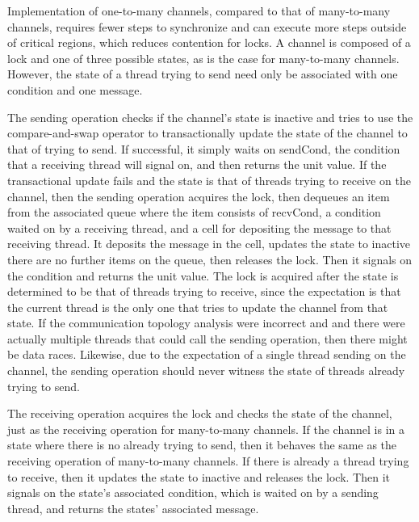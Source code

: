\documentclass{article}
\begin{document}
Implementation of one-to-many channels, compared to that of many-to-many channels,
requires fewer
steps to synchronize and can execute more steps outside of critical regions, which reduces
contention for locks.  A channel is composed of a lock and one of three possible states, as is
the case for many-to-many channels.  However, the state of a thread trying to send need only be
associated with one condition and one message.  

The sending operation checks if the channel's state is inactive and tries to use the
compare-and-swap operator to transactionally update the state of the channel to that of trying to
send.  If successful, it simply waits on sendCond, the condition that a receiving thread will
signal on, and then returns the unit value.  If the transactional update fails and the state is
that of threads trying to receive on the channel, then the sending operation acquires the lock,
then dequeues an item from the associated queue where the item consists of recvCond, a
condition waited on by a receiving thread, and a cell for depositing the message to that
receiving thread.  It deposits the message in the cell, updates the state to inactive there are
no further items on the queue, then releases the lock.  Then it signals on the condition and
returns the unit value. The lock is acquired after the state is determined to be that of
threads trying to receive, since the expectation is that the current thread is the only one
that tries to update the channel from that state.  If the communication topology analysis were
incorrect and and there were actually multiple threads that could call the sending operation, then
there might be data races.  Likewise, due to the expectation of a single thread sending on the
channel, the sending operation should never witness the state of threads already trying to send.

The receiving operation acquires the lock and checks the state of the channel, just as the receiving
operation for many-to-many channels.  If the channel is in a state where there is no already
trying to send, then it behaves the same as the receiving operation of many-to-many channels. If
there is already a thread trying to receive, then it updates the state to inactive and releases
the lock.  Then it signals on the state's associated condition, which is waited on by a sending
thread, and returns the states' associated message.
\end{document}
